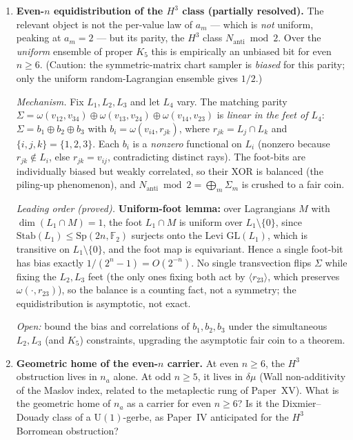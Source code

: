 \documentclass[11pt,a4paper]{article}
\newcommand{\Nanti}{N_{\mathrm{anti}}}
\newcommand{\Sp}{\mathrm{Sp}}
\newcommand{\F}{\mathbb{F}}
\theoremstyle{plain}
\theoremstyle{definition}
\theoremstyle{remark}
\begin{document}
\begin{enumerate}
\item \textbf{Even-$n$ equidistribution of the $H^3$ class (partially resolved).}
  The relevant object is not the per-value law of $a_m$ --- which is \emph{not}
  uniform, peaking at $a_m=2$ --- but its parity, the $H^3$ class
  $\Nanti \bmod 2$. Over the \emph{uniform} ensemble of proper $K_5$ this is
  empirically an unbiased bit for even $n \geq 6$. (Caution: the symmetric-matrix
  chart sampler is \emph{biased} for this parity; only the uniform
  random-Lagrangian ensemble gives $1/2$.)

  \emph{Mechanism.} Fix $L_1,L_2,L_3$ and let $L_4$ vary. The matching parity
  $\Sigma = \omega(v_{12},v_{34}) \oplus \omega(v_{13},v_{24}) \oplus
  \omega(v_{14},v_{23})$ is \emph{linear in the feet of $L_4$}:
  $\Sigma = b_1 \oplus b_2 \oplus b_3$ with $b_i = \omega(v_{i4}, r_{jk})$,
  where $r_{jk}=L_j\cap L_k$ and $\{i,j,k\}=\{1,2,3\}$. Each $b_i$ is a
  \emph{nonzero} functional on $L_i$ (nonzero because $r_{jk}\notin L_i$, else
  $r_{jk}=v_{ij}$, contradicting distinct rays). The foot-bits are individually
  biased but weakly correlated, so their XOR is balanced (the piling-up
  phenomenon), and $\Nanti\bmod2=\bigoplus_m\Sigma_m$ is crushed to a fair coin.

  \emph{Leading order (proved).} \textbf{Uniform-foot lemma:} over Lagrangians $M$
  with $\dim(L_1\cap M)=1$, the foot $L_1\cap M$ is uniform over
  $L_1\setminus\{0\}$, since $\mathrm{Stab}(L_1)\le\Sp(2n,\F_2)$ surjects onto the
  Levi $\mathrm{GL}(L_1)$, which is transitive on $L_1\setminus\{0\}$, and the foot
  map is equivariant. Hence a single foot-bit has bias exactly
  $1/(2^n-1)=O(2^{-n})$. No single transvection flips $\Sigma$ while fixing the
  $L_2,L_3$ feet (the only ones fixing both act by $\langle r_{23}\rangle$, which
  preserves $\omega(\cdot,r_{23})$), so the balance is a counting fact, not a
  symmetry; the equidistribution is asymptotic, not exact.

  \emph{Open:} bound the bias and correlations of $b_1,b_2,b_3$ under the
  simultaneous $L_2,L_3$ (and $K_5$) constraints, upgrading the asymptotic fair
  coin to a theorem.

\item \textbf{Geometric home of the even-$n$ carrier.}
  At even $n \geq 6$, the $H^3$ obstruction lives in $n_a$ alone.
  At odd $n \geq 5$, it lives in $\delta\mu$ (Wall non-additivity of the
  Maslov index, related to the metaplectic rung of Paper~XV).
  What is the geometric home of $n_a$ as a carrier for even $n \geq 6$?
  Is it the Dixmier--Douady class of a $\mathrm{U}(1)$-gerbe, as Paper~IV
  anticipated for the $H^3$ Borromean obstruction?


\end{enumerate}
\end{document}
